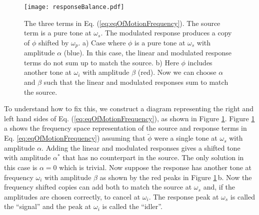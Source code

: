 \documentclass{article}
\begin{document}
\begin{figure}
\begin{centering}
\texttt{[image: responseBalance.pdf]} 
\par\end{centering}
\caption{The three terms in Eq. (\ref{eq:eqOfMotionFrequency}).
The source term is a pure tone at $\omega_s$.
The modulated response produces a copy of $\phi$ shifted by $\omega_p$.
a) Case where $\phi$ is a pure tone at $\omega_s$ with amplitude $\alpha$ (blue).
In this case, the linear and modulated response terms do not sum up to match the source.
b) Here $\phi$ includes another tone at $\omega_i$ with amplitude $\beta$ (red).
Now we can choose $\alpha$ and $\beta$ such that the linear and modulated responses sum to match the source.}
\label{Fig:responseBalance}
\end{figure}

To understand how to fix this, we construct a diagram representing the right and left hand sides of Eq. (\ref{eq:eqOfMotionFrequency}), as shown in Figure \ref{Fig:responseBalance}.
Figure \ref{Fig:responseBalance}\,a shows the frequency space representation of the source and response terms in Eq. \ref{eq:eqOfMotionFrequency}) assuming that $\tilde\phi$ were a single tone at $\omega_s$ with amplitude $\alpha$.
Adding the linear and modulated responses gives a shifted tone with amplitude $\alpha^*$ that has no counterpart in the source.
The only solution in this case is $\alpha=0$ which is trivial.
Now suppose the response has another tone at frequency $\omega_i$ with amplitude $\beta$ as shown by the red peaks in Figure \ref{Fig:responseBalance}\,b.
Now the frequency shifted copies can add both to match the source at $\omega_s$ and, if the amplitudes are chosen correctly, to cancel at $\omega_i$.
The response peak at $\omega_s$ is called the ``signal'' and the peak at $\omega_i$ is called the ``idler''.
\end{document}
